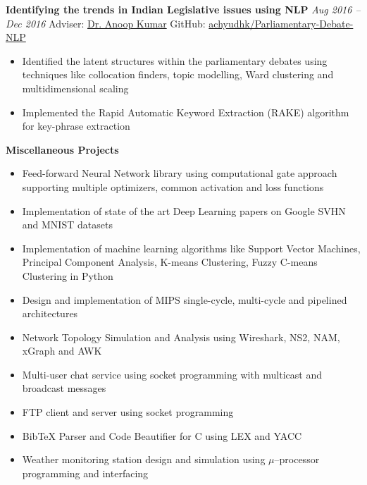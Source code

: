 \documentclass[10pt]{article}
\newenvironment{innerlist}[1][\enskip\textbullet]%
        {\begin{itemize}[#1,leftmargin=*,parsep=0pt,itemsep=0pt,topsep=0pt,partopsep=0pt]}
        {\end{itemize}}
\newcommand{\halfblankline}{\quad\vspace{-0.5\baselineskip}\pagebreak[3]}
\begin{document}
\halfblankline

\textbf{Identifying the trends in Indian Legislative issues using NLP} \hfill \emph{Aug 2016 -- Dec 2016}
Adviser: \href{http://universe.bits-pilani.ac.in/goa/anoopk/Profile}{Dr. Anoop Kumar} \hfill GitHub: \href{https://github.com/achyudhk/Parliamentary-Debate-NLP}{achyudhk/Parliamentary-Debate-NLP}
\vspace{0.5mm}
\begin{innerlist}
\item Identified the latent structures within the parliamentary debates using techniques like collocation finders, topic modelling, Ward clustering and multidimensional scaling
\item Implemented the Rapid Automatic Keyword Extraction (RAKE) algorithm for key-phrase extraction
\end{innerlist}

\halfblankline

\textbf{Miscellaneous Projects}
\begin{innerlist}
\item Feed-forward Neural Network library using computational gate approach supporting multiple optimizers, common activation and loss functions
\item Implementation of state of the art Deep Learning papers on Google SVHN and MNIST datasets 
\item Implementation of machine learning algorithms like Support Vector Machines, Principal Component Analysis, K-means Clustering, Fuzzy C-means Clustering in Python
\item Design and implementation of MIPS single-cycle, multi-cycle and pipelined architectures
\item Network Topology Simulation and Analysis using Wireshark, NS2, NAM, xGraph and AWK
\item Multi-user chat service using socket programming with multicast and broadcast messages
\item FTP client and server using socket programming
\item BibTeX Parser and Code Beautifier for C using LEX and YACC
\item Weather monitoring station design and simulation using $\mu$--processor programming and interfacing
\end{innerlist}
\end{document}
